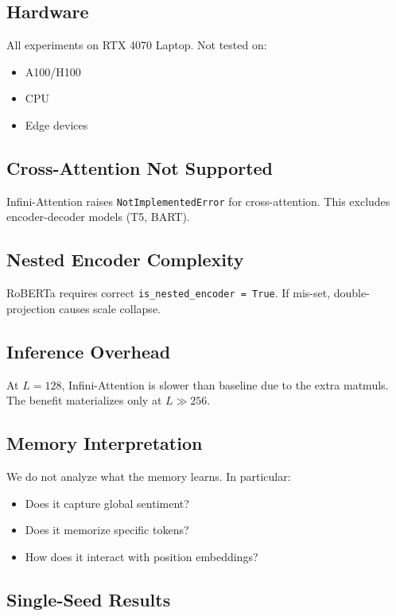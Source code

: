 \subsection{Hardware}

All experiments on RTX 4070 Laptop. Not tested on:

\begin{itemize}
\item A100/H100
\item CPU
\item Edge devices

\end{itemize}
\subsection{Cross-Attention Not Supported}

Infini-Attention raises \texttt{NotImplementedError} for cross-attention. This 
excludes encoder-decoder models (T5, BART).

\subsection{Nested Encoder Complexity}

RoBERTa requires correct \texttt{is\_nested\_encoder = True}. If mis-set, 
double-projection causes scale collapse.

\subsection{Inference Overhead}

At $L = 128$, Infini-Attention is slower than baseline due to the extra 
matmuls. The benefit materializes only at $L \gg 256$.

\subsection{Memory Interpretation}

We do not analyze what the memory learns. In particular:

\begin{itemize}
\item Does it capture global sentiment?
\item Does it memorize specific tokens?
\item How does it interact with position embeddings?

\end{itemize}
\subsection{Single-Seed Results}

